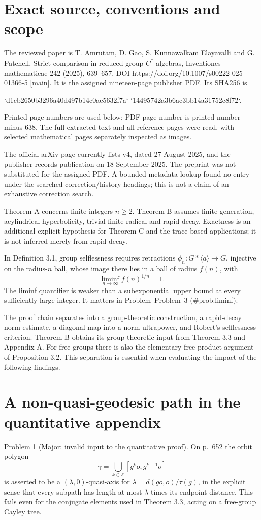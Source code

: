 \documentclass[10pt]{article}
\begin{document}
\section*{Exact source, conventions and scope}
The reviewed paper is T. Amrutam, D. Gao, S. Kunnawalkam Elayavalli and G. Patchell, Strict comparison in reduced group \(C^*\)-algebras, Inventiones mathematicae 242 (2025), 639–657, DOI https://doi.org/10.1007/s00222-025-01366-5 [main]. It is the assigned nineteen-page publisher PDF. Its SHA256 is\par
`d1cb2650b3296a40d497b14c0ae5632f7a`
`14495742a3b6ac3bb14a31752c8f72`.\par
Printed page numbers are used below; PDF page number is printed number minus \(638\). The full extracted text and all reference pages were read, with selected mathematical pages separately inspected as images.\par
The official arXiv page currently lists v4, dated 27 August 2025, and the publisher records publication on 18 September 2025. The preprint was not substituted for the assigned PDF. A bounded metadata lookup found no entry under the searched correction/history headings; this is not a claim of an exhaustive correction search.\par
Theorem A concerns finite integers \(n\ge2\). Theorem B assumes finite generation, acylindrical hyperbolicity, trivial finite radical and rapid decay. Exactness is an additional explicit hypothesis for Theorem C and the trace-based applications; it is not inferred merely from rapid decay.\par
In Definition 3.1, group selflessness requires retractions \(\phi_n:G*\langle a\rangle\to G\), injective on the radius-\(n\) ball, whose image there lies in a ball of radius \(f(n)\), with \[\liminf_{n\to\infty} f(n)^{1/n}=1.\] The liminf quantifier is weaker than a subexponential upper bound at every sufficiently large integer. It matters in Problem Problem 3 (\#prob:liminf).\par
The proof chain separates into a group-theoretic construction, a rapid-decay norm estimate, a diagonal map into a norm ultrapower, and Robert’s selflessness criterion. Theorem B obtains its group-theoretic input from Theorem 3.3 and Appendix A. For free groups there is also the elementary free-product argument of Proposition 3.2. This separation is essential when evaluating the impact of the following findings.\par
\section*{A non-quasi-geodesic path in the quantitative appendix}
Problem 1 (Major: invalid input to the quantitative proof).  On p. 652 the orbit polygon \[\gamma=\bigcup_{k\in\mathbb Z}[g^ko,g^{k+1}o]\] is asserted to be a \((\lambda,0)\)-quasi-axis for \(\lambda=d(go,o)/\tau(g)\), in the explicit sense that every subpath has length at most \(\lambda\) times its endpoint distance. This fails even for the conjugate elements used in Theorem 3.3, acting on a free-group Cayley tree.\par
\end{document}
